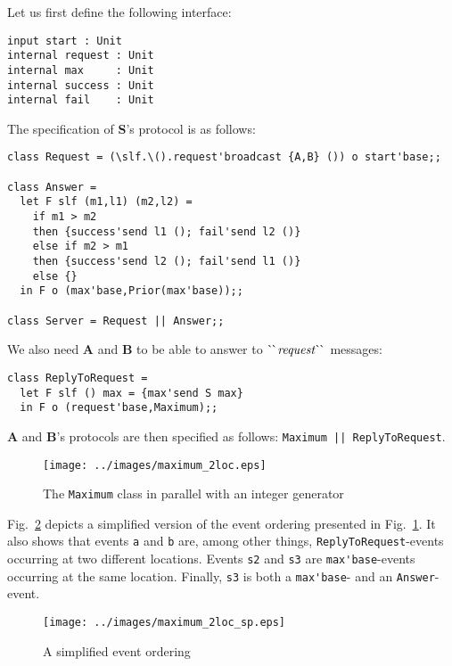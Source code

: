 \documentclass[final]{article}
\begin{document}
Let us first define the following interface:
\begin{emlcode}
\begin{lstlisting}
input start : Unit
internal request : Unit
internal max     : Unit
internal success : Unit
internal fail    : Unit
\end{lstlisting}
\end{emlcode}

The specification of \textbf{S}'s protocol is as follows:
\begin{emlcode}
\begin{lstlisting}
class Request = (\slf.\().request'broadcast {A,B} ()) o start'base;;

class Answer =
  let F slf (m1,l1) (m2,l2) =
    if m1 > m2
    then {success'send l1 (); fail'send l2 ()}
    else if m2 > m1
    then {success'send l2 (); fail'send l1 ()}
    else {}
  in F o (max'base,Prior(max'base));;

class Server = Request || Answer;;
\end{lstlisting}
\end{emlcode}

We also need \textbf{A} and \textbf{B} to be able to answer to
$\CONSatoms{request}$ messages:
\begin{emlcode}
\begin{lstlisting}
class ReplyToRequest =
  let F slf () max = {max'send S max}
  in F o (request'base,Maximum);;
\end{lstlisting}
\end{emlcode}

\textbf{A} and \textbf{B}'s protocols are then specified as follows:
\lstinline{Maximum || ReplyToRequest}.

\begin{figure}[!h]
  \begin{center}
    \texttt{[image: ../images/maximum\_2loc.eps]}
  \end{center}
  \caption{The \lstinline{Maximum} class in parallel with an integer generator}
  \label{fig:maximum+gen}
\end{figure}

Fig.~\ref{fig:max-event-ordering} depicts a simplified version of the
event ordering presented in Fig.~\ref{fig:maximum+gen}.  It also shows
that events \lstinline{a} and \lstinline{b} are, among other things,
\lstinline{ReplyToRequest}-events occurring at two different
locations.  Events \lstinline{s2} and \lstinline{s3} are
\lstinline{max'base}-events occurring at the same location.  Finally,
\lstinline{s3} is both a \lstinline{max'base}- and an
\lstinline{Answer}-event.

\begin{figure}[!h]
  \begin{center}
    \texttt{[image: ../images/maximum\_2loc\_sp.eps]}
  \end{center}
  \caption{A simplified event ordering}
  \label{fig:max-event-ordering}
\end{figure}
\end{document}
